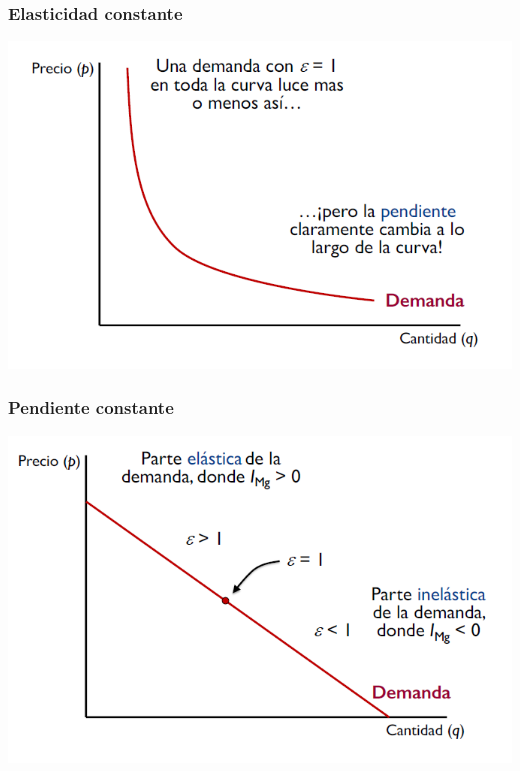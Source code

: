 \documentclass{beamer}
\begin{document}
\begin{frame}
\frametitle{Elasticidad constante}
\includegraphics[scale=0.6]{../Figures/Tema_06.45_elasticidad.png}
\end{frame}

\begin{frame}
\frametitle{Pendiente constante}
\includegraphics[scale=0.6]{../Figures/Tema_06.46_elasticidad2.png}
\end{frame}
\end{document}
